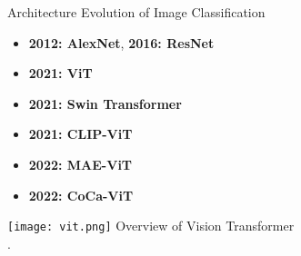 \begin{refsection}
  \begin{frame}{Architecture Evolution of Image Classification}
    \begin{minipage}{0.48\linewidth}
      {\small
      \begin{itemize}
        \item \textbf{2012: AlexNet}, \textbf{2016: ResNet}
        \item \textbf{2021: ViT} \\
        \parencite{dosovitskiyImageWorth16x162020}
        \item \textbf{2021: Swin Transformer} \\
        \parencite{liuSwinTransformerHierarchical2021}
        \item \textbf{2021: CLIP-ViT} \\
        \parencite{radfordLearningTransferableVisual2021}
        \item \textbf{2022: MAE-ViT} \\
        \parencite{heMaskedAutoencodersAre2022}
        \item \textbf{2022: CoCa-ViT} \\
        \parencite{yuCoCaContrastiveCaptioners2022}
      \end{itemize}
      }
    \end{minipage}%
    \hfill
    \begin{minipage}{0.48\linewidth}
      \centering
      \texttt{[image: vit.png]}
      \scriptsize Overview of Vision Transformer\\\parencite{dosovitskiyImageWorth16x162020}.
    \end{minipage}
    \bottomleftrefs
  \end{frame}
\end{refsection}


